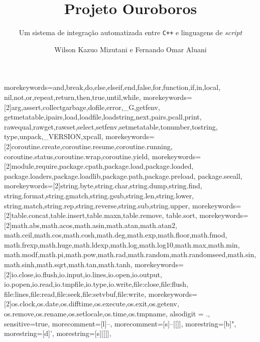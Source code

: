 \documentclass[brazil]{beamer}
\title{
  Projeto Ouroboros
}
\subtitle{
  Um sistema de integração automatizada entre \texttt{C++} e
  linguagens de \textit{script}
}
\author{Wilson Kazuo Mizutani e Fernando Omar Aluani}
\begin{document}
  {morekeywords={and,break,do,else,elseif,end,false,for,function,if,in,local,
     nil,not,or,repeat,return,then,true,until,while},
   morekeywords={[2]arg,assert,collectgarbage,dofile,error,_G,getfenv,
     getmetatable,ipairs,load,loadfile,loadstring,next,pairs,pcall,print,
     rawequal,rawget,rawset,select,setfenv,setmetatable,tonumber,tostring,
     type,unpack,_VERSION,xpcall},
   morekeywords={[2]coroutine.create,coroutine.resume,coroutine.running,
     coroutine.status,coroutine.wrap,coroutine.yield},
   morekeywords={[2]module,require,package.cpath,package.load,package.loaded,
     package.loaders,package.loadlib,package.path,package.preload,
     package.seeall},
   morekeywords={[2]string.byte,string.char,string.dump,string.find,
     string.format,string.gmatch,string.gsub,string.len,string.lower,
     string.match,string.rep,string.reverse,string.sub,string.upper},
   morekeywords={[2]table.concat,table.insert,table.maxn,table.remove,
   table.sort},
   morekeywords={[2]math.abs,math.acos,math.asin,math.atan,math.atan2,
     math.ceil,math.cos,math.cosh,math.deg,math.exp,math.floor,math.fmod,
     math.frexp,math.huge,math.ldexp,math.log,math.log10,math.max,math.min,
     math.modf,math.pi,math.pow,math.rad,math.random,math.randomseed,math.sin,
     math.sinh,math.sqrt,math.tan,math.tanh},
   morekeywords={[2]io.close,io.flush,io.input,io.lines,io.open,io.output,
     io.popen,io.read,io.tmpfile,io.type,io.write,file:close,file:flush,
     file:lines,file:read,file:seek,file:setvbuf,file:write},
   morekeywords={[2]os.clock,os.date,os.difftime,os.execute,os.exit,os.getenv,
     os.remove,os.rename,os.setlocale,os.time,os.tmpname},
   alsodigit = {.},
   sensitive=true,
   morecomment=[l]{--},
   morecomment=[s]{--[[}{]]},
   morestring=[b]",
   morestring=[d]',
   morestring=[s]{[[}{]]},
  }
\end{document}
